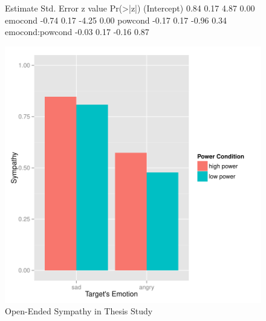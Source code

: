 \documentclass[man,apacite,floatsintext]{apa6}
\begin{document}
\begin{figure}
\begin{Schunk}
\begin{Soutput}
                Estimate Std. Error z value Pr(>|z|)
(Intercept)         0.84       0.17    4.87     0.00
emocond            -0.74       0.17   -4.25     0.00
powcond            -0.17       0.17   -0.96     0.34
emocond:powcond    -0.03       0.17   -0.16     0.87
\end{Soutput}
\end{Schunk}
\includegraphics{PowerResults-ThesisOpenSymp}
\caption{Open-Ended Sympathy in Thesis Study}
\end{figure}
\end{document}
